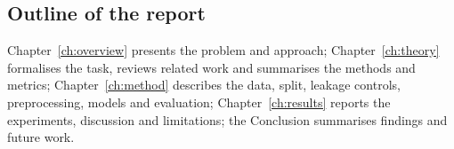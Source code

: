 \subsection*{Outline of the report}

Chapter~\ref{ch:overview} presents the problem and approach; Chapter~\ref{ch:theory} formalises the task, reviews related work and summarises the methods and metrics; Chapter~\ref{ch:method} describes the data, split, leakage controls, preprocessing, models and evaluation; Chapter~\ref{ch:results} reports the experiments, discussion and limitations; the Conclusion summarises findings and future work.

\renewcommand{\thetable}{\thesection.\arabic{table}}
